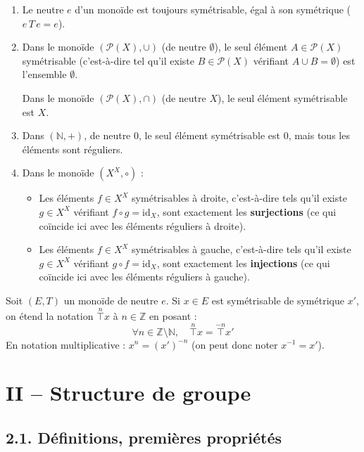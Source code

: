 \documentclass[a4paper,11pt]{article}
\newcommand{\N}{\mathbb{N}}
\newcommand{\Z}{\mathbb{Z}}
\newcommand{\mot}[1]{\textcolor{bordeaux}{\textbf{#1}}}
\begin{document}
\begin{exemples}
\begin{enumerate}
    \item Le neutre $e$ d'un monoïde est toujours symétrisable, égal à son symétrique ($e \, T \, e = e$).
    \item Dans le monoïde $(\mathcal{P}(X), \cup)$ (de neutre $\emptyset$), le seul élément $A \in \mathcal{P}(X)$ symétrisable (c'est-à-dire tel qu'il existe $B \in \mathcal{P}(X)$ vérifiant $A \cup B = \emptyset$) est l'ensemble $\emptyset$.
    
    Dans le monoïde $(\mathcal{P}(X), \cap)$ (de neutre $X$), le seul élément symétrisable est $X$.
    \item Dans $(\N, +)$, de neutre $0$, le seul élément symétrisable est $0$, mais tous les éléments sont réguliers.
    \item Dans le monoïde $(X^X, \circ)$ :
    \begin{itemize}
        \item[\textbf{a)}] Les éléments $f \in X^X$ symétrisables à droite, c'est-à-dire tels qu'il existe $g \in X^X$ vérifiant $f \circ g = \mathrm{id}_X$, sont exactement les \mot{surjections} (ce qui coïncide ici avec les éléments réguliers à droite).
        \item[\textbf{b)}] Les éléments $f \in X^X$ symétrisables à gauche, c'est-à-dire tels qu'il existe $g \in X^X$ vérifiant $g \circ f = \mathrm{id}_X$, sont exactement les \mot{injections} (ce qui coïncide ici avec les éléments réguliers à gauche).
    \end{itemize}
\end{enumerate}
\end{exemples}

\begin{remarque}[Notation $\overset{n}{\top} x$ étendue à $\Z$]
Soit $(E, T)$ un monoïde de neutre $e$. Si $x \in E$ est symétrisable de symétrique $x'$, on étend la notation $\overset{n}{\top} x$ à $n \in \Z$ en posant :
\[
\forall n \in \Z \setminus \N, \quad \overset{n}{\top} x = \overset{-n}{\top} x'
\]
En notation multiplicative : $x^n = (x')^{-n}$ (on peut donc noter $x^{-1} = x'$).
\end{remarque}

\newpage
\section{II -- Structure de groupe}

\subsection{2.1. Définitions, premières propriétés}
\end{document}
